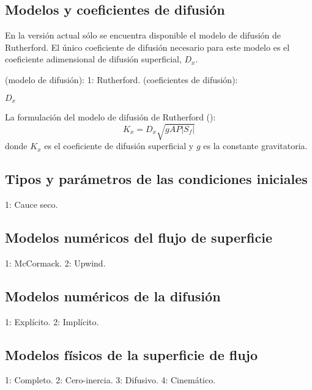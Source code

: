 \documentclass[a4paper,12pt]{report}
\begin{document}
\subsection{Modelos y coeficientes de difusión}

En la versión actual sólo se encuentra disponible el modelo de difusión de Rutherford. El único coeficiente de difusión necesario para este modelo
es el coeficiente adimensional de difusión superficial, $D_x$.
\begin{verbatimtab}[4]
(modelo de difusión): 
		1: Rutherford.
(coeficientes de difusión):
\end{verbatimtab}
\vspace{-0.5cm}
\hspace{1.8cm}$D_x$ 

La formulación del modelo de difusión de Rutherford (\cite{JaviSurcos1}):
\begin{equation}
K_x=D_x\sqrt{gAP|S_f|}
\end{equation}
\noindent donde $K_x$ es el coeficiente de difusión superficial y $g$ es la constante gravitatoria.

\subsection{Tipos y parámetros de las condiciones iniciales}
\begin{verbatimtab}[4]
		1: Cauce seco.
\end{verbatimtab}

\subsection{Modelos numéricos del flujo de superficie}
\begin{verbatimtab}
	1: McCormack.
	2: Upwind.
\end{verbatimtab}

\subsection{Modelos numéricos de la difusión}
\begin{verbatimtab}
	1: Explícito.
	2: Implícito.
\end{verbatimtab}

\subsection{Modelos físicos de la superficie de flujo}
\begin{verbatimtab}
	1: Completo.
	2: Cero-inercia.
	3: Difusivo.
	4: Cinemático.
\end{verbatimtab}
\end{document}
